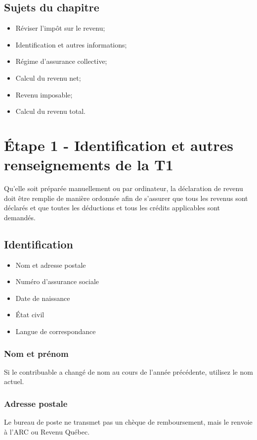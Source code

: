\subsection{Sujets du chapitre}
\begin{itemize}
	\item Réviser l'impôt sur le revenu;
	\item Identification et autres informations;
	\item Régime d'assurance collective;
	\item Calcul du revenu net;
	\item Revenu imposable;
	\item Calcul du revenu total.
\end{itemize}



\section{Étape 1 - \og Identification et autres renseignements\fg{} de la T1}
\begin{intro}
	Qu'elle soit préparée manuellement ou par ordinateur, la déclaration de revenu doit être remplie de manière ordonnée afin de s'assurer que tous les revenus sont déclarés et que toutes les déductions et tous les crédits applicables sont demandés.
\end{intro}


\subsection{Identification}
\begin{itemize}
	\item Nom et adresse postale
	\item Numéro d'assurance sociale
	\item Date de naissance
	\item État civil
	\item Langue de correspondance
\end{itemize}

\subsubsection{Nom et prénom}
Si le contribuable a changé de nom au cours de l'année précédente, utilisez le nom actuel.

\subsubsection{Adresse postale}
Le bureau de poste ne transmet pas un chèque de remboursement, mais le renvoie à l'ARC ou Revenu Québec.

